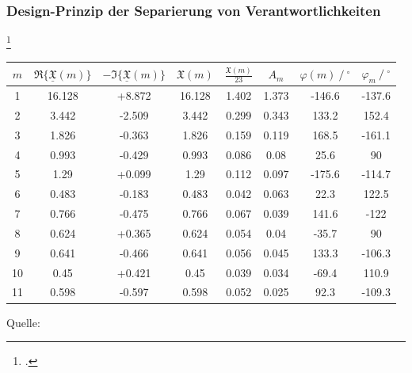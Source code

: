 \subsubsection{Design-Prinzip der Separierung von Verantwortlichkeiten}
\blindtext\footcite[][79]{Schelinski2019}

\begin{table}[h]
    \centering
    \begin{threeparttable}
        \centering
        \begin{tabular}{cccccccc}
            {$m$} & {$\Re\{\underline{\mathfrak{X}}(m)\}$} & {$-\Im\{\underline{\mathfrak{X}}(m)\}$} & {$\mathfrak{X}(m)$} & {$\frac{\mathfrak{X}(m)}{23}$} & {$A_m$} & {$\varphi(m)\ /\ ^{\circ}$} & {$\varphi_m\ /\ ^{\circ}$} \\
            \hline
            1  & 16.128 & +8.872 & 16.128 & 1.402 & 1.373 & -146.6 & -137.6 \\
            2  & 3.442  & -2.509 & 3.442  & 0.299 & 0.343 & 133.2  & 152.4  \\
            3  & 1.826  & -0.363 & 1.826  & 0.159 & 0.119 & 168.5  & -161.1 \\
            4  & 0.993  & -0.429 & 0.993  & 0.086 & 0.08  & 25.6   & 90     \\
            5  & 1.29   & +0.099 & 1.29   & 0.112 & 0.097 & -175.6 & -114.7 \\
            6  & 0.483  & -0.183 & 0.483  & 0.042 & 0.063 & 22.3   & 122.5  \\
            7  & 0.766  & -0.475 & 0.766  & 0.067 & 0.039 & 141.6  & -122   \\
            8  & 0.624  & +0.365 & 0.624  & 0.054 & 0.04  & -35.7  & 90     \\
            9  & 0.641  & -0.466 & 0.641  & 0.056 & 0.045 & 133.3  & -106.3 \\
            10 & 0.45   & +0.421 & 0.45   & 0.039 & 0.034 & -69.4  & 110.9  \\
            11 & 0.598  & -0.597 & 0.598  & 0.052 & 0.025 & 92.3   & -109.3 \\
            \hline
        \end{tabular}
        \begin{tablenotes}[flushleft]
        \item \normalsize{Quelle: \cite[][200]{bsp}}
        \end{tablenotes}
    \end{threeparttable}
\end{table}

